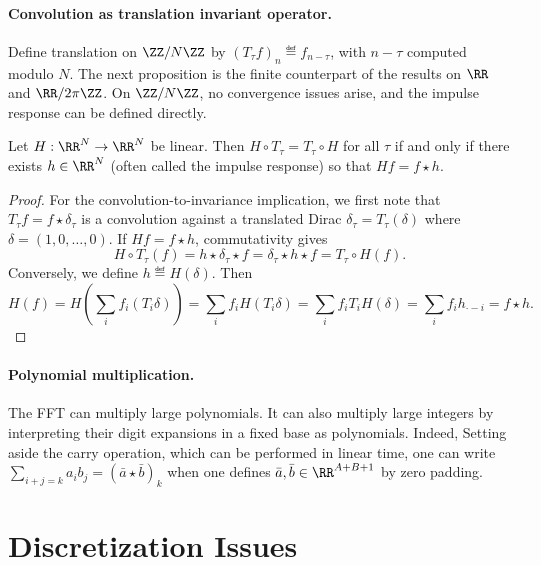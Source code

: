 \paragraph{Convolution as translation invariant operator.}

Define translation on $\ZZ/N\ZZ$ by $(T_\tau f)_n \eqdef f_{n-\tau}$, with $n-\tau$ computed modulo $N$. The next proposition is the finite counterpart of the results on $\RR$ and $\RR/2\pi\ZZ$. On $\ZZ/N\ZZ$, no convergence issues arise, and the impulse response can be defined directly.

\begin{prop}
	Let $H:\RR^N\to\RR^N$ be linear. Then $H \circ T_\tau = T_\tau \circ H$ for all $\tau$ if and only if there exists $h \in \RR^N$ (often called the impulse response) so that $Hf = f \star h$.
\end{prop}

\begin{proof}
	For the convolution-to-invariance implication, we first note that $T_\tau f=f\star\delta_\tau$ is a convolution against a translated Dirac $\delta_\tau=T_\tau(\delta)$ where $\delta=(1,0,\ldots,0)$. If $Hf=f\star h$, commutativity gives
	$$
		H \circ T_\tau(f) = h \star \delta_\tau \star f = \delta_\tau \star h \star f
		= T_\tau \circ H(f).
	$$	
	Conversely, we define $h \eqdef H(\delta)$. Then
	$$
		H(f) = H( \sum_i f_i (T_{i} \delta) ) = \sum_i f_i H(T_i \delta) = \sum_i f_i T_i H(\delta) = \sum_i f_i h_{\cdot-i} = f \star h.
	$$
	 
\end{proof}


\paragraph{Polynomial multiplication.}


The FFT can multiply large polynomials. It can also multiply large integers by interpreting their digit expansions in a fixed base as polynomials. Indeed,
Setting aside the carry operation, which can be performed in linear time,
one can write $\sum_{i+j=k} a_i b_j = (\bar a \star \bar b)_k$ when one defines $\bar a,\bar b\in\RR^{A+B+1}$ by zero padding.


\section{Discretization Issues}
\label{sec-fourier-discretization}

